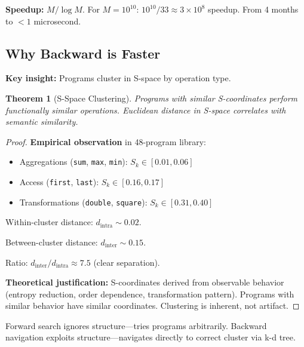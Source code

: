 \documentclass[twocolumn,10pt]{revtex4-2}
\newtheorem{theorem}{Theorem}[section]
\theoremstyle{definition}
\theoremstyle{remark}
\newcommand{\Sk}{S_k}
\begin{document}
\vspace{0.2cm}
\noindent\textbf{Speedup:} $M/\log M$. For $M = 10^{10}$: $10^{10}/33 \approx 3 \times 10^8$ speedup. From 4 months to $<1$ microsecond.

\subsection{Why Backward is Faster}

\textbf{Key insight:} Programs cluster in S-space by operation type.

\begin{theorem}[S-Space Clustering]
\label{thm:clustering}
Programs with similar S-coordinates perform functionally similar operations. Euclidean distance in S-space correlates with semantic similarity.
\end{theorem}

\begin{proof}
\textbf{Empirical observation} in 48-program library:

\begin{itemize}
\item Aggregations (\texttt{sum}, \texttt{max}, \texttt{min}): $\Sk \in [0.01, 0.06]$
\item Access (\texttt{first}, \texttt{last}): $\Sk \in [0.16, 0.17]$
\item Transformations (\texttt{double}, \texttt{square}): $\Sk \in [0.31, 0.40]$
\end{itemize}

Within-cluster distance: $d_{\text{intra}} \sim 0.02$.

Between-cluster distance: $d_{\text{inter}} \sim 0.15$.

Ratio: $d_{\text{inter}}/d_{\text{intra}} \approx 7.5$ (clear separation).

\vspace{0.2cm}
\noindent\textbf{Theoretical justification:} S-coordinates derived from observable behavior (entropy reduction, order dependence, transformation pattern). Programs with similar behavior have similar coordinates. Clustering is inherent, not artifact.
\end{proof}

\vspace{0.2cm}
\noindent Forward search ignores structure—tries programs arbitrarily. Backward navigation exploits structure—navigates directly to correct cluster via k-d tree.

\end{document}
